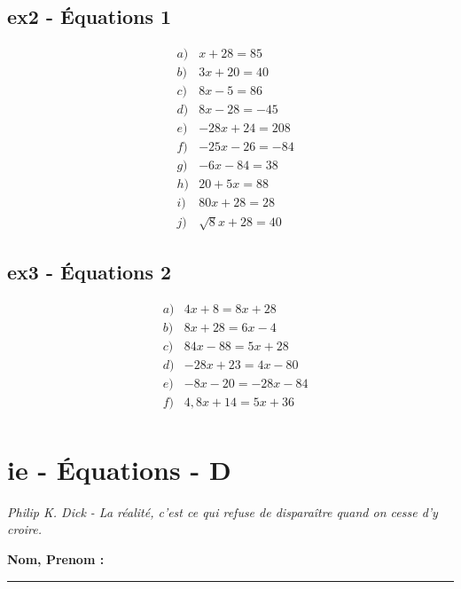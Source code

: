 \documentclass[12pt]{article}
\newcommand{\horrule}[1]{\rule{\linewidth}{#1}} %
\begin{document}
  \begin{multicols}{2}
    \subsection*{ex2 - Équations 1}

    \begin{eqnarray*}
      & a) & x + 28 = 85  \\
      & b) & 3x + 20 = 40  \\
      & c) & 8x - 5  = 86  \\
      & d) & 8x - 28 = -45 \\
      & e) & -28x + 24 = 208 \\
      & f) & -25x - 26 = -84 \\
      & g) & -6x - 84 = 38  \\
      & h) & 20 + 5x = 88  \\
      & i) & 80x + 28 = 28 \\
      & j) & \sqrt{8} x + 28 = 40 
    \end{eqnarray*}


    \subsection*{ex3 - Équations 2}

    \begin{eqnarray*}
      & a) & 4x + 8 = 8x + 28    \\
      & b) & 8x + 28 = 6x - 4     \\
      & c) & 84x - 88 = 5x + 28    \\
      & d) & -28x + 23 = 4x -80     \\
      & e) & -8x - 20 = -28x - 84  \\
      & f) & 4,8x + 14 = 5x + 36    \\
    \end{eqnarray*}
  \end{multicols}

  \newpage

  \section*{ie - Équations - D}
\begin{center}
  \textit{Philip K. Dick - La réalité, c'est ce qui refuse de disparaître quand on cesse d'y croire.}
\end{center}
\textbf{Nom, Prenom :}\\
\horrule{2px}
\end{document}
